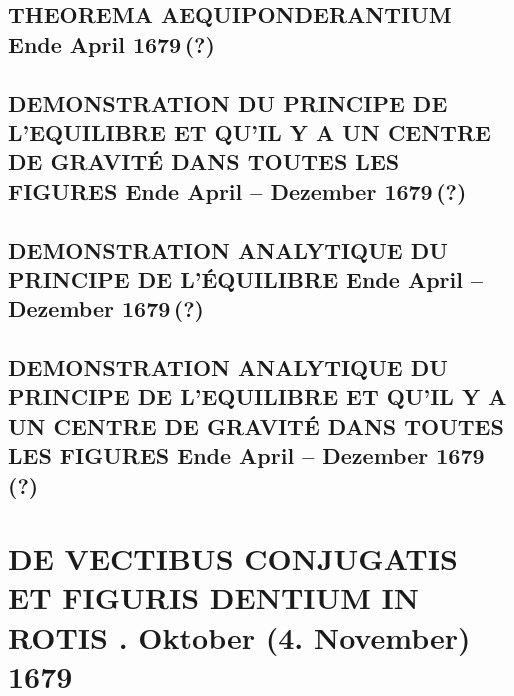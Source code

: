 \documentclass[%
fontsize=10pt,
]{scrbook}
\DeclareRobustCommand{\bracks}[1]{%
\textup{\lbrack}#1\textup{\rbrack}}
\begin{document}
\section[tocentry={Theorema aequiponderantium
\enskip \bracks{Ende April 1679\,(?)}},
head={Theorema aequiponderantium}]
{\MakeUppercase{Theorema aequiponderantium}
\newline \bracks{Ende April 1679\,(?)}}
\label{57036}

\section[tocentry={Demonstration du principe de l'equilibre et qu'il y a un centre de gravité dans toutes les figures
\enskip \bracks{Ende April -- Dezember 1679\,(?)}},
head={Demonstration du principe de l'equilibre}]
{\MakeUppercase{Demonstration du principe de l'equilibre et qu'il y a un centre de gravité dans toutes les figures}
\newline \bracks{Ende April -- Dezember 1679\,(?)}}
\label{57033+41135}
  
\section[tocentry={Demonstration analytique du principe de l'équilibre 
\enskip \bracks{Ende April -- Dezember 1679\,(?)}},
head={Demonstration analytique du principe de l'équilibre}]
{\MakeUppercase{Demonstration analytique du principe de l'équilibre} 
\newline \bracks{Ende April -- Dezember 1679\,(?)}}
\label{41134}

\section[tocentry={Demonstration analytique du Principe de l'Equilibre et qu'il y a un centre de gravité dans toutes les figures
\enskip \bracks{Ende April -- Dezember 1679\,(?)}},
head={Demonstration analytique du Principe de l'Equilibre}]
{\MakeUppercase{Demonstration analytique du Principe de l'Equilibre et qu'il y a un centre de gravité dans toutes les figures}
\newline \bracks{Ende April -- Dezember 1679\,(?)}}
\label{41136}






\chapter[tocentry={De vectibus conjugatis et figuris dentium in rotis
\enskip 25. Oktober (4. November) 1679
},
head={De vectibus conjugatis et figuris dentium in rotis}]%
{\MakeUppercase{De vectibus conjugatis et figuris dentium in rotis}
. Oktober (4. November) 1679
}
\end{document}
